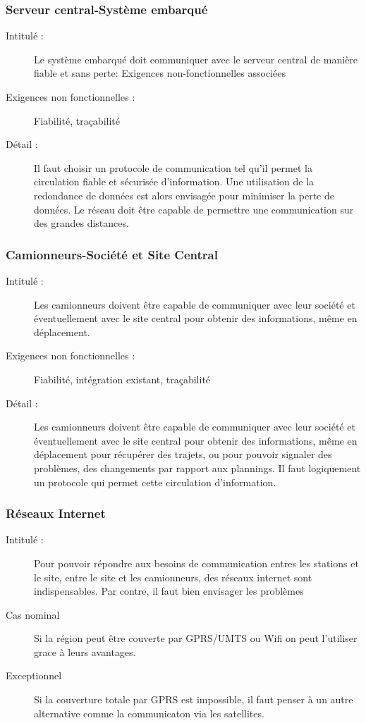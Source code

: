 \documentclass[11pt]{article}
\begin{document}
\subsubsection {Serveur central-Système embarqué}
\begin{description}
           \item[Intitulé :] Le système embarqué doit communiquer avec le serveur central de manière fiable et sans perte:
Exigences non-fonctionnelles associées
           \item[Exigences non fonctionnelles :]  Fiabilité, traçabilité 
           \item[Détail :] Il faut choisir un protocole de communication tel qu'il permet la circulation fiable et sécurisée d’information.
Une utilisation de la redondance de données est alors envisagée pour minimiser la perte de données. Le réseau doit être capable 
de permettre une communication sur des grandes distances.
\end{description}

\subsubsection {Camionneurs-Société et Site Central}
\begin{description}
           \item[Intitulé :] Les camionneurs doivent être capable de communiquer avec leur société et éventuellement avec le site central pour obtenir des informations, même en déplacement.
           \item[Exigences non fonctionnelles :] Fiabilité, intégration existant, traçabilité
           \item[Détail :]  Les camionneurs doivent être capable de communiquer avec leur société et éventuellement avec le site central pour obtenir des informations, même en déplacement pour récupérer des trajets, ou pour pouvoir signaler des problèmes, des changements
par rapport aux plannings. Il faut logiquement un protocole qui permet cette circulation d'information. 
\end{description}

\subsubsection {Réseaux Internet}
\begin{description}
          \item[Intitulé :] Pour pouvoir répondre aux besoins de communication entres les stations et le site, entre le site et les camionneurs, des réseaux internet sont indispensables. Par contre, il faut bien
	envisager les problèmes 
          \item[Cas nominal] Si la région peut être couverte par GPRS/UMTS ou Wifi on peut l'utiliser grace à leurs avantages. 
          \item[Exceptionnel] Si la couverture totale par GPRS est impossible, il faut penser à un autre alternative comme la communicaton via les satellites.
\end{description}
\end{document}
